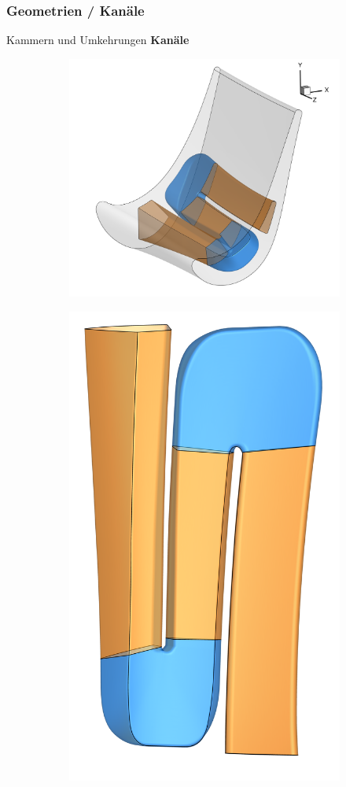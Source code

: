 \documentclass[8pt, aspectratio=169]{beamer}
\begin{document}
\begin{frame}
	\frametitle{Geometrien / Kanäle}
	\vspace{-0.25cm}\hspace{-0.5cm}
	Kammern und Umkehrungen \textrightarrow{} \textbf{Kanäle}
	\centering
	\begin{minipage}[t]{.8\textwidth}
		\begin{figure}[H]
			\centering
			\begin{subfigure}{.49\textwidth}
				\includegraphics[width=\textwidth]{../../tec/complete/020.png}
			\end{subfigure}
			\begin{subfigure}{.49\textwidth}
				\centering
				\includegraphics[width=.5\textwidth]{../../tec/complete/021.png}
			\end{subfigure}
		\end{figure}
	\end{minipage}
	\vfill
\end{frame}
\end{document}
